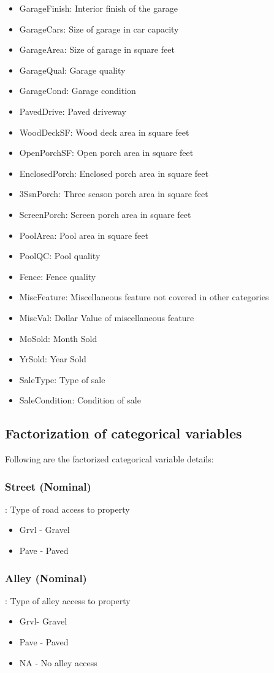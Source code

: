 \documentclass[sigconf]{acmart}
\begin{document}
\begin{itemize}
	\item GarageFinish: Interior finish of the garage
	\item GarageCars: Size of garage in car capacity
	\item GarageArea: Size of garage in square feet
	\item GarageQual: Garage quality
	\item GarageCond: Garage condition
	\item PavedDrive: Paved driveway
	\item WoodDeckSF: Wood deck area in square feet
	\item OpenPorchSF: Open porch area in square feet
	\item EnclosedPorch: Enclosed porch area in square feet
	\item 3SsnPorch: Three season porch area in square feet
	\item ScreenPorch: Screen porch area in square feet
	\item PoolArea: Pool area in square feet
	\item PoolQC: Pool quality
	\item Fence: Fence quality
	\item MiscFeature: Miscellaneous feature not covered in other categories
	\item MiscVal: Dollar Value of miscellaneous feature
	\item MoSold: Month Sold
	\item YrSold: Year Sold
	\item SaleType: Type of sale
	\item SaleCondition: Condition of sale
    \end{itemize}

	\subsection{Factorization of categorical variables}
	Following are the factorized categorical variable details:

	\subsubsection{Street (Nominal)}: Type of road access to property
	\begin{itemize}
		\item  Grvl - Gravel
		\item  Pave - Paved
	\end{itemize}

	\subsubsection{Alley (Nominal)}: Type of alley access to property
	\begin{itemize}
		\item  Grvl- Gravel
		\item  Pave - Paved
		\item  NA - No alley access
	\end{itemize}
\end{document}
